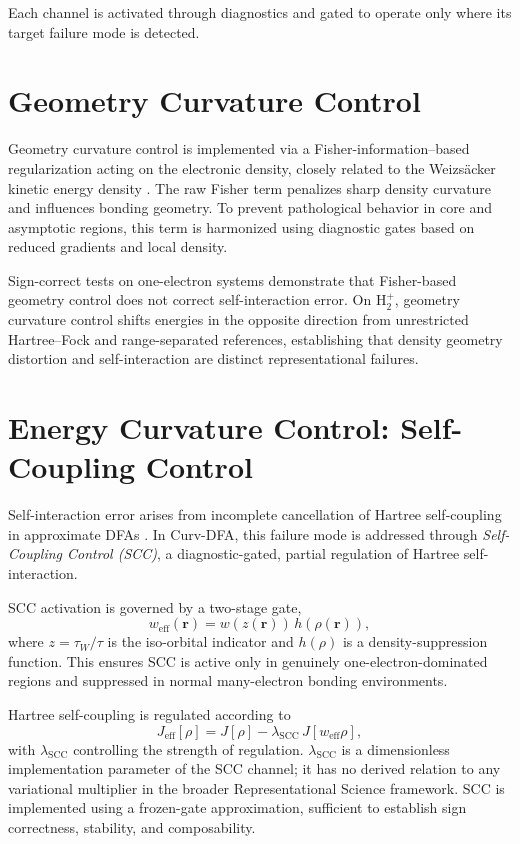 \documentclass[11pt]{article}
\begin{document}
Each channel is activated through diagnostics and gated to operate only where its target failure mode is detected.

\section{Geometry Curvature Control}

Geometry curvature control is implemented via a Fisher-information--based regularization acting on the electronic density, closely related to the Weizsäcker kinetic energy density \cite{Weizsaecker}. The raw Fisher term penalizes sharp density curvature and influences bonding geometry. To prevent pathological behavior in core and asymptotic regions, this term is harmonized using diagnostic gates based on reduced gradients and local density.

Sign-correct tests on one-electron systems demonstrate that Fisher-based geometry control does not correct self-interaction error. On H$_2^+$, geometry curvature control shifts energies in the opposite direction from unrestricted Hartree--Fock and range-separated references, establishing that density geometry distortion and self-interaction are distinct representational failures.

\section{Energy Curvature Control: Self-Coupling Control}

Self-interaction error arises from incomplete cancellation of Hartree self-coupling in approximate DFAs \cite{PerdewZungerSIC}. In Curv-DFA, this failure mode is addressed through \emph{Self-Coupling Control (SCC)}, a diagnostic-gated, partial regulation of Hartree self-interaction.

SCC activation is governed by a two-stage gate,
\begin{equation}
w_{\mathrm{eff}}(\mathbf r) = w(z(\mathbf r))\,h(\rho(\mathbf r)),
\end{equation}
where $z=\tau_W/\tau$ is the iso-orbital indicator \cite{SCAN} and $h(\rho)$ is a density-suppression function. This ensures SCC is active only in genuinely one-electron-dominated regions and suppressed in normal many-electron bonding environments.

Hartree self-coupling is regulated according to
\begin{equation}
J_{\mathrm{eff}}[\rho] = J[\rho] - \lambda_{\mathrm{SCC}}\,J[w_{\mathrm{eff}}\rho],
\end{equation}
with $\lambda_{\mathrm{SCC}}$ controlling the strength of regulation. $\lambda_{\mathrm{SCC}}$ is a dimensionless implementation parameter of the SCC channel; it has no derived relation to any variational multiplier in the broader Representational Science framework. SCC is implemented using a frozen-gate approximation, sufficient to establish sign correctness, stability, and composability.
\end{document}
